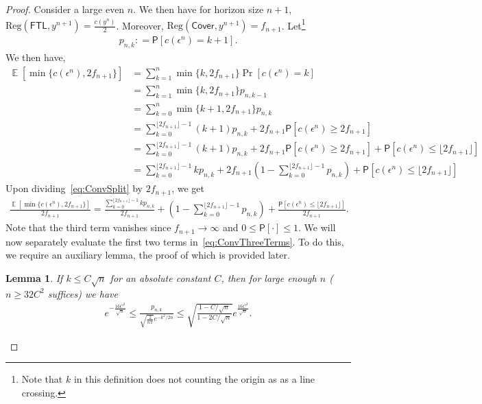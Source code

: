 \documentclass[twoside]{article}
\newtheorem{lemma}{Lemma}
\newcommand{\Prob}{\mathsf{P}}
\newcommand{\defeq}{\mathrel{\mathop{:}}=}
\newcommand{\e}{\epsilon}
\newcommand{\Reg}{\mathrm{Reg}}
\DeclareMathOperator\E{\mathbb{E}}
\newcommand{\ftl}{\mathsf{FTL}}
\newcommand{\Cover}{\mathsf{Cover}}
\begin{document}
\begin{proof}
    Consider a large even $n$. We then have for horizon size $n+1$, $\Reg(\ftl,y^{n+1}) = \frac{c(y^n)}{2}$.  Moreover, $\Reg(\Cover,y^{n+1}) = f_{n+1}$. Let\footnote{Note that $k$ in this definition does not counting the origin as as a line crossing.}
    \begin{align}\label{eq:PnkDefn}
        p_{n,k} \defeq \Prob[c(\e^{n}) = k+1].
    \end{align}
    We then have,
    \begin{align}
     \E[\min\{c(\e^n), 2f_{n+1}\}] &= \sum_{k=1}^n \min\{k, 2f_{n+1}\} \Pr[c(\e^n) = k]\nonumber\\
        &= \sum_{k=1}^n \min\{k, 2f_{n+1}\} p_{n,k-1} \nonumber\\
        &= \sum_{k=0}^n \min\{k+1,2f_{n+1}\}p_{n,k} \nonumber\\
        &= \sum_{k=0}^{\lfloor 2f_{n+1} \rfloor-1} (k+1)p_{n,k} + 2f_{n+1} \Prob[c(\e^n) \ge 2f_{n+1}] \nonumber\\
        &= \sum_{k=0}^{\lfloor 2f_{n+1} \rfloor-1} (k+1)p_{n,k} + 2f_{n+1} \Prob[c(\e^n) \ge 2f_{n+1}] + \Prob[c(\e^n) \le \lfloor 2f_{n+1}\rfloor] \nonumber\\
        &=  \sum_{k=0}^{\lfloor 2f_{n+1} \rfloor-1} kp_{n,k} + 2f_{n+1} \left(1-\sum_{k=0}^{\lfloor 2f_{n+1} \rfloor-1} p_{n,k}\right) +  \Prob[c(\e^n) \le \lfloor 2f_{n+1}\rfloor] \label{eq:ConvSplit}
    \end{align} 
    Upon dividing~\eqref{eq:ConvSplit} by $2f_{n+1}$, we get 
    \begin{align} \label{eq:ConvThreeTerms}
      \frac{\E[\min\{c(\e^n), 2f_{n+1}\}]}{2f_{n+1}}  = \frac{\sum_{k=0}^{\lfloor 2f_{n+1} \rfloor-1} kp_{n,k}}{2f_{n+1}} +  \left(1-\sum_{k=0}^{\lfloor 2f_{n+1} \rfloor-1} p_{n,k}\right) +  \frac{\Prob[c(\e^n) \le \lfloor 2f_{n+1}\rfloor]}{2f_{n+1}}.
    \end{align}
    Note that the third term vanishes since $f_{n+1} \to \infty$ and $0 \le \Prob[\cdot] \le 1$. We will now separately evaluate the first two terms in~\eqref{eq:ConvThreeTerms}. To do this, we require an auxiliary lemma, the proof of which is provided later.
    \begin{lemma}\label{lem:pnkasymptotics}
        If $k \le C\sqrt{n}$ for an absolute constant $C$, then for large enough $n$ ($n \ge 32C^2$ suffices) we have
        \begin{align}\label{eq:pnkDensityApprox}
            e^{-\frac{16C^3}{\sqrt{n}}} \le \frac{p_{n,k}}{\sqrt{\frac{2}{n\pi}}e^{-k^2/2n}} \le \sqrt{\frac{1-C/\sqrt{n}}{1-2C/\sqrt{n}}} e^{\frac{16C^3}{\sqrt{n}}}.

\end{align}
\end{lemma}
\end{proof}
\end{document}
